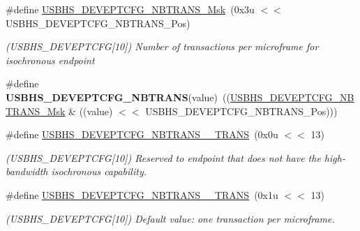 \begin{DoxyCompactItemize}
\item 
\mbox{\label{group__SAMS70__USBHS_gab90c7fa9a6197762b7b552d39b9e71f2}} 
\#define \mbox{\hyperlink{group__SAMS70__USBHS_gab90c7fa9a6197762b7b552d39b9e71f2}{U\+S\+B\+H\+S\+\_\+\+D\+E\+V\+E\+P\+T\+C\+F\+G\+\_\+\+N\+B\+T\+R\+A\+N\+S\+\_\+\+Msk}}~(0x3u $<$$<$ U\+S\+B\+H\+S\+\_\+\+D\+E\+V\+E\+P\+T\+C\+F\+G\+\_\+\+N\+B\+T\+R\+A\+N\+S\+\_\+\+Pos)
\begin{DoxyCompactList}\small\item\em (U\+S\+B\+H\+S\+\_\+\+D\+E\+V\+E\+P\+T\+C\+FG\mbox{[}10\mbox{]}) Number of transactions per microframe for isochronous endpoint \end{DoxyCompactList}\item 
\mbox{\label{group__SAMS70__USBHS_gacb8cd28dc4bff779aea27ad425d9b82e}} 
\#define {\bfseries U\+S\+B\+H\+S\+\_\+\+D\+E\+V\+E\+P\+T\+C\+F\+G\+\_\+\+N\+B\+T\+R\+A\+NS}(value)~((\mbox{\hyperlink{group__SAMV71__USBHS_gab90c7fa9a6197762b7b552d39b9e71f2}{U\+S\+B\+H\+S\+\_\+\+D\+E\+V\+E\+P\+T\+C\+F\+G\+\_\+\+N\+B\+T\+R\+A\+N\+S\+\_\+\+Msk}} \& ((value) $<$$<$ U\+S\+B\+H\+S\+\_\+\+D\+E\+V\+E\+P\+T\+C\+F\+G\+\_\+\+N\+B\+T\+R\+A\+N\+S\+\_\+\+Pos)))
\item 
\mbox{\label{group__SAMS70__USBHS_ga43b2db530b01ee6470bfc7054287b538}} 
\#define \mbox{\hyperlink{group__SAMS70__USBHS_ga43b2db530b01ee6470bfc7054287b538}{U\+S\+B\+H\+S\+\_\+\+D\+E\+V\+E\+P\+T\+C\+F\+G\+\_\+\+N\+B\+T\+R\+A\+N\+S\+\_\+\_\+\+T\+R\+A\+NS}}~(0x0u $<$$<$ 13)
\begin{DoxyCompactList}\small\item\em (U\+S\+B\+H\+S\+\_\+\+D\+E\+V\+E\+P\+T\+C\+FG\mbox{[}10\mbox{]}) Reserved to endpoint that does not have the high-\/bandwidth isochronous capability. \end{DoxyCompactList}\item 
\mbox{\label{group__SAMS70__USBHS_ga6db69fd65f655a87942c2302b78e888c}} 
\#define \mbox{\hyperlink{group__SAMS70__USBHS_ga6db69fd65f655a87942c2302b78e888c}{U\+S\+B\+H\+S\+\_\+\+D\+E\+V\+E\+P\+T\+C\+F\+G\+\_\+\+N\+B\+T\+R\+A\+N\+S\+\_\+\_\+\+T\+R\+A\+NS}}~(0x1u $<$$<$ 13)
\begin{DoxyCompactList}\small\item\em (U\+S\+B\+H\+S\+\_\+\+D\+E\+V\+E\+P\+T\+C\+FG\mbox{[}10\mbox{]}) Default value\+: one transaction per microframe. \end{DoxyCompactList}\item 

\end{DoxyCompactItemize}
